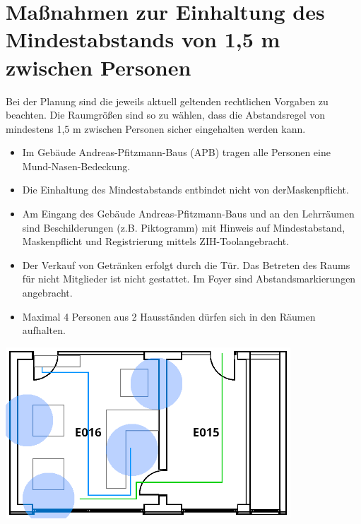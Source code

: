 \documentclass[12pt]{article}
\begin{document}
    \section{Maßnahmen zur Einhaltung des Mindestabstands von 1,5 m zwischen Personen}
        Bei der Planung sind die jeweils aktuell geltenden rechtlichen Vorgaben zu beachten.
        Die Raumgrößen sind so zu wählen, dass die Abstandsregel von mindestens 1,5 m zwischen Personen sicher eingehalten werden kann.
        \begin{itemize}
            \item Im Gebäude Andreas-Pfitzmann-Baus (APB) tragen alle Personen eine Mund-Nasen-Bedeckung.
            \item Die Einhaltung des Mindestabstands entbindet nicht von derMaskenpflicht.
            \item Am Eingang des Gebäude Andreas-Pfitzmann-Baus und an den Lehrräumen sind Beschilderungen (z.B. Piktogramm) mit Hinweis auf Mindestabstand, Maskenpflicht und Registrierung mittels ZIH-Toolangebracht.
            \item Der Verkauf von Getränken erfolgt durch die Tür. 
                Das Betreten des Raums für nicht Mitglieder ist nicht gestattet. 
                Im Foyer sind Abstandsmarkierungen angebracht.
            \item Maximal 4 Personen aus 2 Hausständen dürfen sich in den Räumen aufhalten. 
        \end{itemize}

        \begin{center}
            \includegraphics[width=0.8\textwidth]{Hygienekonzept.png}
        \end{center}
\end{document}
